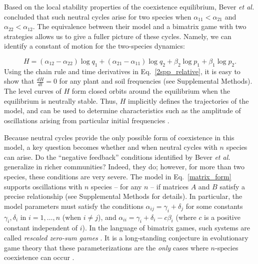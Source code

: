 \documentclass[11pt]{article}
\begin{document}
Based on the local stability properties of the coexistence equilibrium, Bever \textit{et al.} concluded that such neutral cycles arise for two species when $\alpha_{11} < \alpha_{21}$ and $\alpha_{22} < \alpha_{12}$. The equivalence between their model and a bimatrix game with two strategies allows us to give a fuller picture of these cycles. Namely, we can identify a constant of motion for the two-species dynamics:

\begin{equation}
	H = (\alpha_{12} - \alpha_{22}) \log q_1 + (\alpha_{21} - \alpha_{11}) \log q_2 + \beta_2 \log p_1 + \beta_1 \log p_2 .
\end{equation} 
Using the chain rule and time derivatives in Eq.~\ref{2spp_relative}, it is easy to show that $\frac{dH}{dt} = 0$ for any plant and soil frequencies (see Supplemental Methods). The level curves of $H$ form closed orbits around the equilibrium when the equilibrium is neutrally stable. Thus, $H$ implicitly defines the trajectories of the model, and can be used to determine characteristics such as the amplitude of oscillations arising from particular initial frequencies \citep{volterra1926variazioni}.

Because neutral cycles provide the only possible form of coexistence in this model, a key question becomes whether and when neutral cycles with $n$ species can arise. Do the ``negative feedback'' conditions identified by Bever \textit{et al.} generalize in richer communities? Indeed, they do; however, for more than two species, these conditions are very severe. The model in Eq.~\ref{matrix_form} supports oscillations with $n$ species -- for any $n$ -- if matrices $A$ and $B$ satisfy a precise relationship (see Supplemental Methods for details). In particular, the model parameters must satisfy the conditions $\alpha_{ij} = \gamma_i + \delta_j$ for some constants $\gamma_i, \delta_i$ in $i = 1, \dots, n$ (when $i \neq j$), and $\alpha_{ii} = \gamma_i + \delta_i- c \beta_i$ (where $c$ is a positive constant independent of $i$). In the language of bimatrix games, such systems are called \emph{rescaled zero-sum games} \citep{hofbauer1996evolutionary,hofbauer1998evolutionary}. It is a long-standing conjecture in evolutionary game theory that these parameterizations are the \emph{only} cases where $n$-species coexistence can occur \citep{hofbauer1996evolutionary,hofbauer2011deterministic}.
\end{document}
